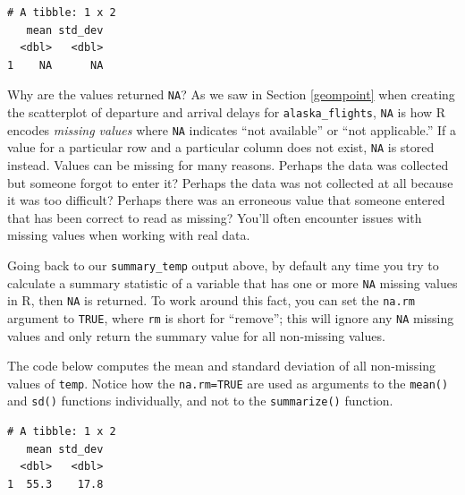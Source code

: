 \documentclass[12pt, krantz2,]{krantz}
\makeatletter
\newenvironment{Shaded}{\begin{snugshade}}{\end{snugshade}}
\newcommand{\DataTypeTok}[1]{\textcolor[rgb]{0.27,0.27,0.27}{#1}}
\newcommand{\KeywordTok}[1]{\textcolor[rgb]{0.27,0.27,0.27}{\textbf{#1}}}
\newcommand{\NormalTok}[1]{#1}
\newcommand{\OperatorTok}[1]{\textcolor[rgb]{0.43,0.43,0.43}{\textbf{#1}}}
\newcommand{\OtherTok}[1]{\textcolor[rgb]{0.37,0.37,0.37}{#1}}
\newcommand{\StringTok}[1]{\textcolor[rgb]{0.5,0.5,0.5}{#1}}
\newenvironment{kframe}{%
\medskip{}
\setlength{\fboxsep}{.8em}
 \def\at@end@of@kframe{}%
 \ifinner\ifhmode%
  \def\at@end@of@kframe{\end{minipage}}%
  \begin{minipage}{\columnwidth}%
 \fi\fi%
 \def\FrameCommand##1{\hskip\@totalleftmargin \hskip-\fboxsep
 \colorbox{shadecolor}{##1}\hskip-\fboxsep
     \hskip-\linewidth \hskip-\@totalleftmargin \hskip\columnwidth}%
 \MakeFramed {\advance\hsize-\width
   \@totalleftmargin\z@ \linewidth\hsize
   \@setminipage}}%
 {\par\unskip\endMakeFramed%
 \at@end@of@kframe}
\renewenvironment{Shaded}{\begin{kframe}}{\end{kframe}}
\makeatother
\begin{document}
\begin{verbatim}
# A tibble: 1 x 2
   mean std_dev
  <dbl>   <dbl>
1    NA      NA
\end{verbatim}

Why are the values returned \texttt{NA}? As we saw in Section \ref{geompoint} when creating the scatterplot of departure and arrival delays for \texttt{alaska\_flights}, \texttt{NA} is how R encodes \emph{missing values} where \texttt{NA} indicates ``not available'' or ``not applicable.'' If a value for a particular row and a particular column does not exist, \texttt{NA} is stored instead. Values can be missing for many reasons. Perhaps the data was collected but someone forgot to enter it? Perhaps the data was not collected at all because it was too difficult? Perhaps there was an erroneous value that someone entered that has been correct to read as missing? You'll often encounter issues with missing values when working with real data.

Going back to our \texttt{summary\_temp} output above, by default any time you try to calculate a summary statistic of a variable that has one or more \texttt{NA} missing values in R, then \texttt{NA} is returned. To work around this fact, you can set the \texttt{na.rm} argument to \texttt{TRUE}, where \texttt{rm} is short for ``remove''; this will ignore any \texttt{NA} missing values and only return the summary value for all non-missing values.

The code below computes the mean and standard deviation of all non-missing values of \texttt{temp}. Notice how the \texttt{na.rm=TRUE} are used as arguments to the \texttt{mean()} and \texttt{sd()} functions individually, and not to the \texttt{summarize()} function.

\begin{Shaded}
\end{Shaded}

\begin{verbatim}
# A tibble: 1 x 2
   mean std_dev
  <dbl>   <dbl>
1  55.3    17.8
\end{verbatim}
\end{document}
